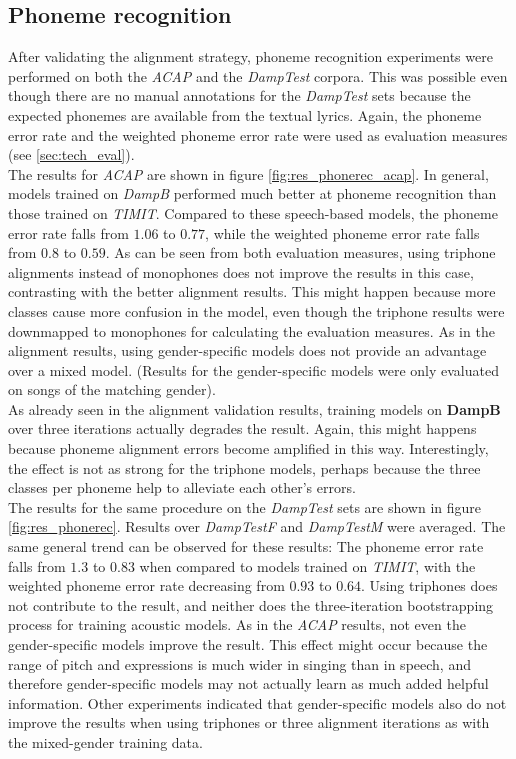 \subsection{Phoneme recognition}
After validating the alignment strategy, phoneme recognition experiments were performed on both the \textit{ACAP} and the \textit{DampTest} corpora. This was possible even though there are no manual annotations for the \textit{DampTest} sets because the expected phonemes are available from the textual lyrics. Again, the phoneme error rate and the weighted phoneme error rate were used as evaluation measures (see \ref{sec:tech_eval}).\\
The results for \textit{ACAP} are shown in figure \ref{fig:res_phonerec_acap}. In general, models trained on \textit{DampB} performed much better at phoneme recognition than those trained on \textit{TIMIT}. Compared to these speech-based models, the phoneme error rate falls from $1.06$ to $0.77$, while the weighted phoneme error rate falls from $0.8$ to $0.59$. As can be seen from both evaluation measures, using triphone alignments instead of monophones does not improve the results in this case, contrasting with the better alignment results. This might happen because more classes cause more confusion in the model, even though the triphone results were downmapped to monophones for calculating the evaluation measures. As in the alignment results, using gender-specific models does not provide an advantage over a mixed model. (Results for the gender-specific models were only evaluated on songs of the matching gender).\\
As already seen in the alignment validation results, training models on \textbf{DampB} over three iterations actually degrades the result. Again, this might happens because phoneme alignment errors become amplified in this way. Interestingly, the effect is not as strong for the triphone models, perhaps because the three classes per phoneme help to alleviate each other's errors.\\

The results for the same procedure on the \textit{DampTest} sets are shown in figure \ref{fig:res_phonerec}. Results over \textit{DampTestF} and \textit{DampTestM} were averaged.
The same general trend can be observed for these results: The phoneme error rate falls from $1.3$ to $0.83$ when compared to models trained on \textit{TIMIT}, with the weighted phoneme error rate decreasing from $0.93$ to $0.64$. Using triphones does not contribute to the result, and neither does the three-iteration bootstrapping process for training acoustic models. As in the \textit{ACAP} results, not even the gender-specific models improve the result. This effect might occur because the range of pitch and expressions is much wider in singing than in speech, and therefore gender-specific models may not actually learn as much added helpful information. Other experiments indicated that gender-specific models also do not improve the results when using triphones or three alignment iterations as with the mixed-gender training data.\\

